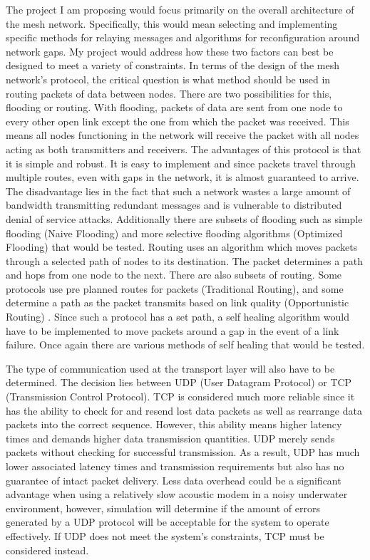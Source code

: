 \documentclass[10pt]{article}
\begin{document}
The project I am proposing would focus primarily on the overall architecture of the mesh network. Specifically, this would mean selecting and implementing specific methods for relaying messages and algorithms for reconfiguration around network gaps. My project would address how these two factors can best be designed to meet a variety of constraints. In terms of the design of the mesh network’s protocol, the critical question is what method should be used in routing packets of data between nodes. There are two possibilities for this, flooding or routing. With flooding, packets of data are sent from one node to every other open link except the one from which the packet was received. This means all nodes functioning in the network will receive the packet with all nodes acting as both transmitters and receivers. The advantages of this protocol is that it is simple and robust. It is easy to implement and since packets travel through multiple routes, even with gaps in the network, it is almost guaranteed to arrive. The disadvantage lies in the fact that such a network wastes a large amount of bandwidth transmitting redundant messages and is vulnerable to distributed denial of service attacks. Additionally there are subsets of flooding such as simple flooding (Naive Flooding) and more selective flooding algorithms (Optimized Flooding) that would be tested\cite{zahn2009empirical}. Routing uses an algorithm which moves packets through a selected path of nodes to its destination. The packet determines a path and hops from one node to the next. There are also subsets of routing. Some protocols use pre planned routes for packets (Traditional Routing), and some determine a path as the packet transmits based on link quality (Opportunistic Routing) \cite{hamraz2019wireless}. Since such a protocol has a set path, a self healing algorithm would have to be implemented to move packets around a gap in the event of a link failure. Once again there are various methods of self healing that would be tested\cite{trehan2019algorithms}.

The type of communication used at the transport layer will also have to be determined. The decision lies between UDP (User Datagram Protocol) or TCP (Transmission Control Protocol). TCP is considered much more reliable since it has the ability to check for and resend lost data packets as well as rearrange data packets into the correct sequence. However, this ability means higher latency times and demands higher data transmission quantities. UDP merely sends packets without checking for successful transmission. As a result, UDP has much lower associated latency times and transmission requirements but also has no guarantee of intact packet delivery. Less data overhead could be a significant advantage when using a relatively slow acoustic modem in a noisy underwater environment, however, simulation will determine if the amount of errors generated by a UDP protocol will be acceptable for the system to operate effectively. If UDP does not meet the system’s constraints, TCP must be considered instead\cite{rouse2019what}.
\end{document}
